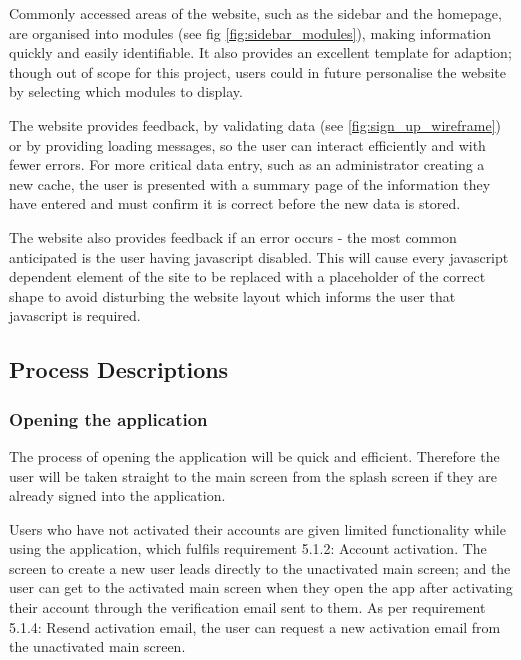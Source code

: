 Commonly accessed areas of the website, such as the sidebar and the homepage, are organised into modules (see fig \ref{fig:sidebar_modules}), making information quickly and easily identifiable. It also provides an excellent template for adaption; though out of scope for this project, users could in future personalise the website by selecting which modules to display.

The website provides feedback, by validating data (see \ref{fig:sign_up_wireframe}) or by providing loading messages, so the user can interact efficiently and with fewer errors. For more critical data entry, such as an administrator creating a new cache, the user is presented with a summary page of the information they have entered and must confirm it is correct before the new data is stored.

The website also provides feedback if an error occurs - the most common anticipated is the user having javascript disabled. This will cause every javascript dependent element of the site to be replaced with a placeholder of the correct shape to avoid disturbing the website layout which informs the user that javascript is required.

\subsection{Process Descriptions}
\subsubsection{Opening the application}

The process of opening the application will be quick and efficient. Therefore the user will be taken straight to the main screen from the splash screen if they are already signed into the application.

Users who have not activated their accounts are given limited functionality while using the application, which fulfils requirement 5.1.2: Account activation. The screen to create a new user leads directly to the unactivated main screen; and the user can get to the activated main screen when they open the app after activating their account through the verification email sent to them. As per requirement 5.1.4: Resend activation email, the user can request a new activation email from the unactivated main screen.

